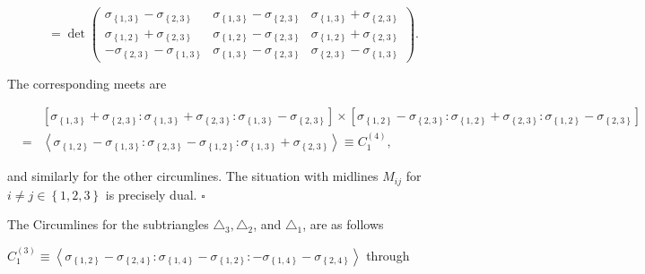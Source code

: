 \documentclass[11pt]{article}
\begin{document}
\begin{equation*}
=\det \left( 
\begin{array}{ccc}
\sigma _{\left\{ 1,3\right\} }-\sigma _{\left\{ 2,3\right\} } & \sigma
_{\left\{ 1,3\right\} }-\sigma _{\left\{ 2,3\right\} } & \sigma _{\left\{
1,3\right\} }+\sigma _{\left\{ 2,3\right\} } \\ 
\sigma _{\left\{ 1,2\right\} }+\sigma _{\left\{ 2,3\right\} } & \sigma
_{\left\{ 1,2\right\} }-\sigma _{\left\{ 2,3\right\} } & \sigma _{\left\{
1,2\right\} }+\sigma _{\left\{ 2,3\right\} } \\ 
-\sigma _{\left\{ 2,3\right\} }-\sigma _{\left\{ 1,3\right\} } & \sigma
_{\left\{ 1,3\right\} }-\sigma _{\left\{ 2,3\right\} } & \sigma _{\left\{
2,3\right\} }-\sigma _{\left\{ 1,3\right\} }%
\end{array}%
\right) .
\end{equation*}

The corresponding meets are

\begin{eqnarray*}
&&\left[ \sigma _{\left\{ 1,3\right\} }+\sigma _{\left\{ 2,3\right\}
}:\sigma _{\left\{ 1,3\right\} }+\sigma _{\left\{ 2,3\right\} }:\sigma
_{\left\{ 1,3\right\} }-\sigma _{\left\{ 2,3\right\} }\right] \times \left[
\sigma _{\left\{ 1,2\right\} }-\sigma _{\left\{ 2,3\right\} }:\sigma
_{\left\{ 1,2\right\} }+\sigma _{\left\{ 2,3\right\} }:\sigma _{\left\{
1,2\right\} }-\sigma _{\left\{ 2,3\right\} }\right] \\
&=&\left\langle \sigma _{\left\{ 1,2\right\} }-\sigma _{\left\{ 1,3\right\}
}:\sigma _{\left\{ 2,3\right\} }-\sigma _{\left\{ 1,2\right\} }:\sigma
_{\left\{ 1,3\right\} }+\sigma _{\left\{ 2,3\right\} }\right\rangle \equiv
C_{1}^{\left( 4\right) },
\end{eqnarray*}

and similarly for the other circumlines. The situation with midlines $M_{ij}$
for $i\neq j\in \left\{ 1,2,3\right\} $ is precisely dual. $\square $

\bigskip

The Circumlines for the subtriangles $\triangle _{3},\triangle _{2}$, and $%
\triangle _{1}$, are as follows

$C_{1}^{\left( 3\right) }\equiv \left\langle \sigma _{\left\{ 1,2\right\}
}-\sigma _{\left\{ 2,4\right\} }:\sigma _{\left\{ 1,4\right\} }-\sigma
_{\left\{ 1,2\right\} }:-\sigma _{\left\{ 1,4\right\} }-\sigma _{\left\{
2,4\right\} }\right\rangle $ through
\end{document}
